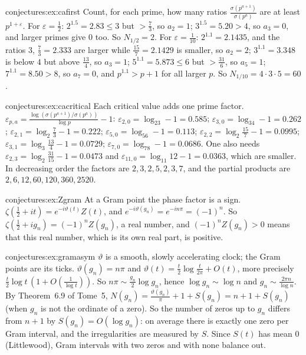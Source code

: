 \begin{solution}{conjectures:ex:cafirst}
\idea Count, for each prime, how many ratios $\frac{\sigma(p^{a+1})}{\sigma(p^a)}$ are at least $p^{1+\varepsilon}$.
\writeup For $\varepsilon=\frac12$: $2^{1.5}=2.83\le3$ but $>\frac73$, so $a_2=1$; $3^{1.5}=5.20>4$, so $a_3=0$, and larger primes give $0$ too. So $N_{1/2}=2$.
For $\varepsilon=\frac1{10}$: $2^{1.1}=2.1435$, and the ratios $3$, $\frac73=2.333$ are larger while $\frac{15}7=2.1429$ is smaller, so $a_2=2$; $3^{1.1}=3.348$ is below
$4$ but above $\frac{13}4$, so $a_3=1$; $5^{1.1}=5.873\le6$ but $>\frac{31}6$, so $a_5=1$; $7^{1.1}=8.50>8$, so $a_7=0$, and $p^{1.1}>p+1$ for all larger $p$. So
$N_{1/10}=4\cdot3\cdot5=60$.
\end{solution}

\begin{solution}{conjectures:ex:cacritical}
\idea Each critical value adds one prime factor.
\writeup $\varepsilon_{p,a}=\frac{\log(\sigma(p^{a+1})/\sigma(p^a))}{\log p}-1$: $\varepsilon_{2,0}=\log_23-1=0.585$; $\varepsilon_{3,0}=\log_34-1=0.262$; $\varepsilon_{2,1}=\log_2\frac73-1=0.222$;
$\varepsilon_{5,0}=\log_56-1=0.113$; $\varepsilon_{2,2}=\log_2\frac{15}7-1=0.0995$; $\varepsilon_{3,1}=\log_3\frac{13}4-1=0.0729$; $\varepsilon_{7,0}=\log_78-1=0.0686$. One also needs
$\varepsilon_{2,3}=\log_2\frac{31}{15}-1=0.0473$ and $\varepsilon_{11,0}=\log_{11}12-1=0.0363$, which are smaller. In decreasing order the factors are $2,3,2,5,2,3,7$, and the
partial products are $2,6,12,60,120,360,2520$.
\end{solution}

\begin{solution}{conjectures:ex:Zgram}
\idea At a Gram point the phase factor is a sign.
\writeup $\zeta(\frac12+it)=e^{-i\vartheta(t)}Z(t)$, and $e^{-i\vartheta(g_n)}=e^{-in\pi}=(-1)^n$. So $\zeta(\frac12+ig_n)=(-1)^nZ(g_n)$, a real number, and $(-1)^nZ(g_n)>0$ means
that this real number, which is its own real part, is positive.
\end{solution}

\begin{solution}{conjectures:ex:gramasym}
\idea $\vartheta$ is a smooth, slowly accelerating clock; the Gram points are its ticks.
\writeup $\vartheta(g_n)=n\pi$ and $\vartheta(t)=\frac t2\log\frac t{2\pi}+O(t)$, more precisely $\frac t2\log t\,(1+O(\frac1{\log t}))$. So $n\pi\sim\frac{g_n}2\log g_n$, hence
$\log g_n\sim\log n$ and $g_n\sim\frac{2\pi n}{\log n}$. By Theorem~6.9 of Tome~5, $N(g_n)=\frac{\vartheta(g_n)}\pi+1+S(g_n)=n+1+S(g_n)$ (when $g_n$ is not the ordinate of a
zero). So the number of zeros up to $g_n$ differs from $n+1$ by $S(g_n)=O(\log g_n)$: on average there is exactly one zero per Gram interval, and the
irregularities are measured by $S$. Since $S(t)$ has mean $0$ (Littlewood), Gram intervals with two zeros and with none balance out.
\end{solution}

